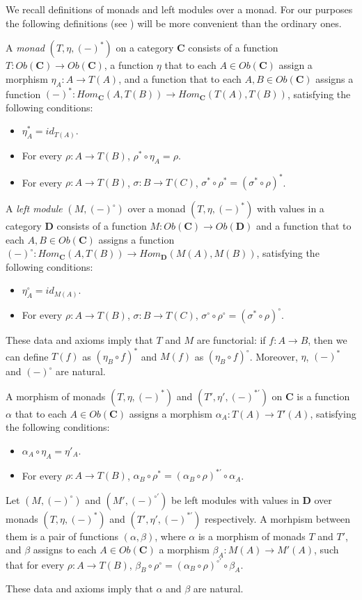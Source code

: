 \documentclass[reqno]{amsart}
\theoremstyle{definition}
\theoremstyle{remark}
\newcommand{\cat}[1]{\mathbf{#1}}
\newcommand{\C}{\cat{C}}
\newcommand{\D}{\cat{D}}
\numberwithin{figure}{section}
\begin{document}
We recall definitions of monads and left modules over a monad.
For our purposes the following definitions (see \cite{manes-algebraic-theories}) will be more convenient than the ordinary ones.
\begin{defn}
A \emph{monad} $(T,\eta,(-)^*)$ on a category $\C$ consists of a function $T : Ob(\C) \to Ob(\C)$,
a function $\eta$ that to each $A \in Ob(\C)$ assign a morphism $\eta_A : A \to T(A)$,
and a function that to each $A,B \in Ob(\C)$ assigns a function $(-)^* : Hom_\C(A,T(B)) \to Hom_\C(T(A),T(B))$, satisfying the following conditions:
\begin{itemize}
\item $\eta_A^* = id_{T(A)}$.
\item For every $\rho : A \to T(B)$, $\rho^* \circ \eta_A = \rho$.
\item For every $\rho : A \to T(B)$, $\sigma : B \to T(C)$, $\sigma^* \circ \rho^* = (\sigma^* \circ \rho)^*$.
\end{itemize}

A \emph{left module} $(M,(-)^\circ)$ over a monad $(T,\eta,(-)^*)$ with values in a category $\D$ consists of a function $M : Ob(\C) \to Ob(\D)$
and a function that to each $A,B \in Ob(\C)$ assigns a function $(-)^\circ : Hom_\C(A,T(B)) \to Hom_\D(M(A),M(B))$, satisfying the following conditions:
\begin{itemize}
\item $\eta_A^\circ = id_{M(A)}$.
\item For every $\rho : A \to T(B)$, $\sigma : B \to T(C)$, $\sigma^\circ \circ \rho^\circ = (\sigma^* \circ \rho)^\circ$.
\end{itemize}
\end{defn}
These data and axioms imply that $T$ and $M$ are functorial: if $f : A \to B$, then we can define $T(f)$ as $(\eta_B \circ f)^*$ and $M(f)$ as $(\eta_B \circ f)^\circ$.
Moreover, $\eta$, $(-)^*$ and $(-)^\circ$ are natural.

\begin{defn}
A morphism of monads $(T,\eta,(-)^*)$ and $(T',\eta',(-)^{*'})$ on $\C$ is a function $\alpha$ that to each $A \in Ob(\C)$ assigns a morphism $\alpha_A : T(A) \to T'(A)$,
satisfying the following conditions:
\begin{itemize}
\item $\alpha_A \circ \eta_A = \eta'_A$.
\item For every $\rho : A \to T(B)$, $\alpha_B \circ \rho^* = (\alpha_B \circ \rho)^{*'} \circ \alpha_A$.
\end{itemize}

Let $(M,(-)^\circ)$ and $(M',(-)^{\circ'})$ be left modules with values in $\D$ over monads $(T,\eta,(-)^*)$ and $(T',\eta',(-)^{*'})$ respectively.
A morhpism between them is a pair of functions $(\alpha,\beta)$, where $\alpha$ is a morphism of monads $T$ and $T'$,
and $\beta$ assigns to each $A \in Ob(\C)$ a morphism $\beta_A : M(A) \to M'(A)$,
such that for every $\rho : A \to T(B)$, $\beta_B \circ \rho^\circ = (\alpha_B \circ \rho)^{\circ'} \circ \beta_A$.
\end{defn}
These data and axioms imply that $\alpha$ and $\beta$ are natural.
\end{document}
